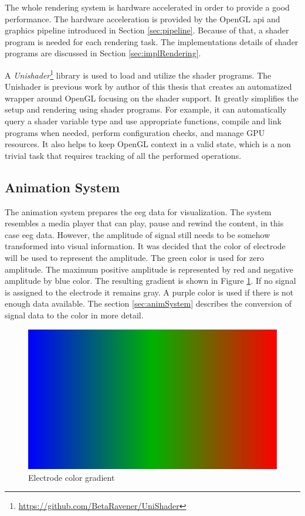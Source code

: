 The whole rendering system is hardware accelerated in order to provide a good performance. The hardware acceleration is provided by the OpenGL \gls{api} and graphics pipeline introduced in Section \ref{sec:pipeline}. Because of that, a shader program is needed for each rendering task. The implementations details of shader programs are discussed in Section \ref{sec:implRendering}. 

A \emph{Unishader}\footnote{\url{https://github.com/BetaRavener/UniShader}} library is used to load and utilize the shader programs. The Unishader is previous work by author of this thesis that creates an automatized wrapper around OpenGL focusing on the shader support. It greatly simplifies the setup and rendering using shader programs. For example, it can automatically query a shader variable type and use appropriate functions, compile and link programs when needed, perform configuration checks, and manage GPU resources. It also helps to keep OpenGL context in a valid state, which is a non trivial task that requires tracking of all the performed operations.

\subsection{Animation System}
\label{ssec:concAnimSystem}
The animation system prepares the \gls{eeg} data for visualization. The system resembles a media player that can play, pause and rewind the content, in this case \gls{eeg} data. However, the amplitude of signal still needs to be somehow transformed into visual information. It was decided that the color of electrode will be used to represent the amplitude. The green color is used for zero amplitude. The maximum positive amplitude is represented by red and negative amplitude by blue color. The resulting gradient is shown in Figure \ref{fig:ElColorGradient}. If no signal is assigned to the electrode it remains gray. A purple color is used if there is not enough data available. The section \ref{sec:animSystem} describes the conversion of signal data to the color in more detail.

\begin{figure}[htb]
	\centering
	\includegraphics[width=0.8\linewidth, height=0.05\textheight]{fig/gradient.pdf}
	\caption{Electrode color gradient}
	\label{fig:ElColorGradient}
\end{figure}

